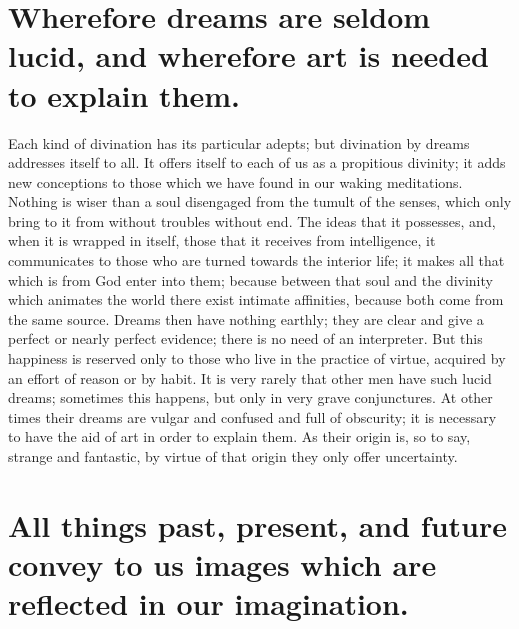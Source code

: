 \documentclass[12pt]{article}
\begin{document}
\section{Wherefore dreams are seldom lucid, and wherefore art is needed to
explain them.}

Each kind of divination has its particular adepts; but divination by dreams
addresses itself to all. It offers itself to each of us as a propitious
divinity; it adds new conceptions to those which we have found in our waking
meditations. Nothing is wiser than a soul disengaged from the tumult of the
senses, which only bring to it from without troubles without end. The ideas
that it possesses, and, when it is wrapped in itself, those that it receives
from intelligence, it communicates to those who are turned towards the interior
life; it makes all that which is from God enter into them; because between that
soul and the divinity which animates the world there exist intimate affinities,
because both come from the same source. Dreams then have nothing earthly; they
are clear and give a perfect or nearly perfect evidence; there is no need of an
interpreter. But this happiness is reserved only to those who live in the
practice of virtue, acquired by an effort of reason or by habit. It is very
rarely that other men have such lucid dreams; sometimes this happens, but only
in very grave conjunctures. At other times their dreams are vulgar and confused
and full of obscurity; it is necessary to have the aid of art in order to
explain them. As their origin is, so to say, strange and fantastic, by virtue
of that origin they only offer uncertainty.


\section{All things past, present, and future convey to us images which are
reflected in our imagination.}
\end{document}
